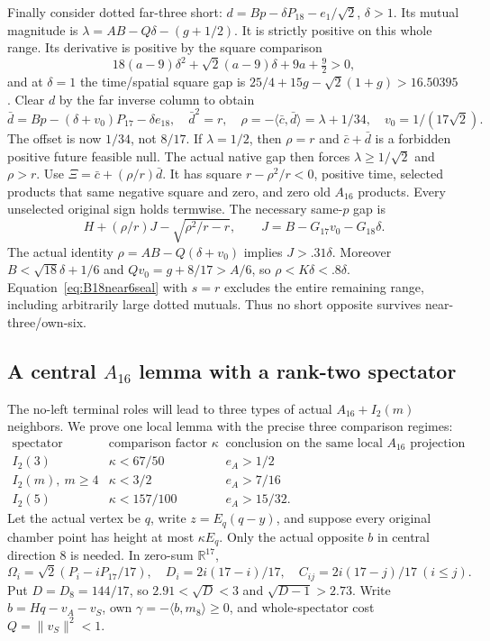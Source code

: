 \documentclass[11pt]{article}
\theoremstyle{definition}
\theoremstyle{remark}
\newcommand{\ip}[2]{\langle #1,#2\rangle}
\newcommand{\norm}[1]{\lVert #1\rVert}
\begin{document}
Finally consider dotted far-three short:
\(d=Bp-\delta P_{18}-e_1/\sqrt2\), \(\delta>1\).
Its mutual magnitude is
\(\lambda=AB-Q\delta-(g+1/2)\).
It is strictly positive on this whole range.
Its derivative is positive by the square comparison
\[
 18(a-9)\delta^2+\sqrt2(a-9)\delta+9a+\tfrac92>0 ,
\]
and at \(\delta=1\) the time/spatial square gap is
\(25/4+15g-\sqrt2(1+g)>16.50395\).
Clear \(d\) by the far inverse column to obtain
\[
 \bar d=Bp-(\delta+v_0)P_{17}-\delta e_{18},\quad
 \bar d^2=r,\quad
 \rho=-\ip{\bar c}{\bar d}=\lambda+1/34,\quad
 v_0=1/(17\sqrt2).
\]
The offset is now \(1/34\), not \(8/17\).
If \(\lambda=1/2\), then \(\rho=r\) and
\(\bar c+\bar d\) is a forbidden positive future feasible null.
The actual native gap then forces \(\lambda\geq1/\sqrt2\)
and \(\rho>r\).
Use \(\Xi=\bar c+(\rho/r)\bar d\).
It has square \(r-\rho^2/r<0\), positive time,
selected products that same negative square and zero, and zero
old \(A_{16}\) products. Every unselected original sign holds
termwise. The necessary same-\(p\) gap is
\[
 H+(\rho/r)J-\sqrt{\rho^2/r-r},\qquad
 J=B-G_{17}v_0-G_{18}\delta .
\]
The actual identity \(\rho=AB-Q(\delta+v_0)\) implies
\(J>.31\delta\). Moreover \(B<\sqrt{18}\delta+1/6\) and
\(Qv_0=g+8/17>A/6\), so \(\rho<K\delta<.8\delta\).
Equation~\eqref{eq:B18near6seal} with \(s=r\) excludes the
entire remaining range, including arbitrarily large dotted mutuals.
Thus no short opposite survives near-three/own-six.

\subsection[A central A16 lemma with a rank-two spectator]{A central \(A_{16}\) lemma with a rank-two spectator}
\label{app:B18localA16}
The no-left terminal roles will lead to three types of actual
\(A_{16}+I_2(m)\) neighbors. We prove one local lemma with the
precise three comparison regimes:
\[
\begin{array}{c|c|c}
\text{spectator}&\text{comparison factor }\kappa&
 \text{conclusion on the same local \(A_{16}\) projection}\\ \hline
 I_2(3)&\kappa<67/50&e_A>1/2\\
 I_2(m),\ m\geq4&\kappa<3/2&e_A>7/16\\
 I_2(5)&\kappa<157/100&e_A>15/32 .
\end{array}
\]
Let the actual vertex be \(q\), write \(z=E_q(q-y)\), and suppose
every original chamber point has height at most \(\kappa E_q\).
Only the actual opposite \(b\) in central direction \(8\) is needed.
In zero-sum \(\mathbb R^{17}\),
\[
 \Omega_i=\sqrt2(P_i-iP_{17}/17),\quad
 D_i=2i(17-i)/17,\quad C_{ij}=2i(17-j)/17\ (i\leq j).
\]
Put \(D=D_8=144/17\), so \(2.91<\sqrt D<3\) and
\(\sqrt{D-1}>2.73\).
Write \(b=Hq-v_A-v_S\), own \(\gamma=-\ip b{m_8}\geq0\),
and whole-spectator cost \(Q=\norm{v_S}^2<1\).
\end{document}
